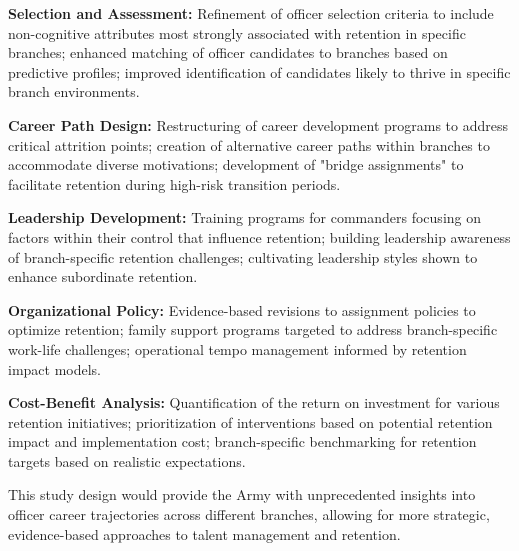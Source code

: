 \documentclass[../main.tex]{subfiles}
\begin{document}
\textbf{Selection and Assessment:} Refinement of officer selection criteria to include non-cognitive attributes most strongly associated with retention in specific branches; enhanced matching of officer candidates to branches based on predictive profiles; improved identification of candidates likely to thrive in specific branch environments.

\textbf{Career Path Design:} Restructuring of career development programs to address critical attrition points; creation of alternative career paths within branches to accommodate diverse motivations; development of "bridge assignments" to facilitate retention during high-risk transition periods.

\textbf{Leadership Development:} Training programs for commanders focusing on factors within their control that influence retention; building leadership awareness of branch-specific retention challenges; cultivating leadership styles shown to enhance subordinate retention.

\textbf{Organizational Policy:} Evidence-based revisions to assignment policies to optimize retention; family support programs targeted to address branch-specific work-life challenges; operational tempo management informed by retention impact models.

\textbf{Cost-Benefit Analysis:} Quantification of the return on investment for various retention initiatives; prioritization of interventions based on potential retention impact and implementation cost; branch-specific benchmarking for retention targets based on realistic expectations.

This study design would provide the Army with unprecedented insights into officer career trajectories across different branches, allowing for more strategic, evidence-based approaches to talent management and retention.

\end{document}
